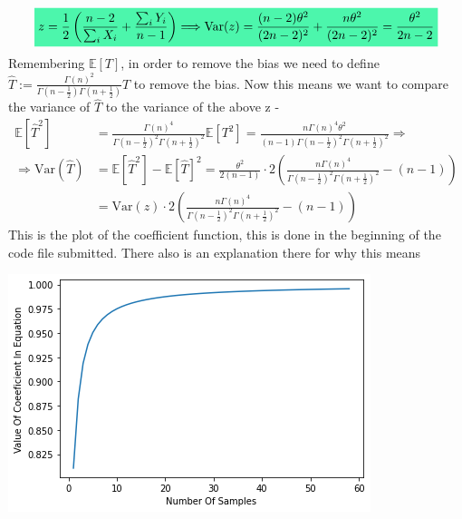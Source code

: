 \documentclass[../main.tex]{subfiles}
\begin{document}
\begin{enumerate}
    \[\mathcolorbox{goodcolor}{z=\frac{1}{2}\left(\frac{n-2}{\sum_i X_i} + \frac{\sum_i Y_i}{n-1}\right)\Longrightarrow \text{Var}(z) = \frac{(n-2)\theta^2}{(2n-2)^2}+\frac{n\theta^2}{(2n-2)^2} = \frac{\theta^2}{2n-2}}\]
    Remembering $\mathbb{E}[T]$, in order to remove the bias we need to define $\hat{T}:= \frac{\Gamma(n)^2}{\Gamma(n-\frac{1}{2})\Gamma(n+\frac{1}{2})}T$ to remove the bias. Now this means we want to compare the variance of $\hat{T}$ to the variance of the above z - 
    \begin{align*}
    \mathbb{E}\left[\hat{T}^2\right] &= \frac{\Gamma(n)^4}{\Gamma(n-\frac{1}{2})^2\Gamma(n+\frac{1}{2})^2}\mathbb{E}\left[T^2\right] = \frac{n\Gamma(n)^4\theta^2}{(n-1)\Gamma(n-\frac{1}{2})^2\Gamma(n+\frac{1}{2})^2} \Longrightarrow \\
    \Longrightarrow\text{Var}\left(\hat{T}\right) &= \mathbb{E}\left[\hat{T}^2\right] - \mathbb{E}\left[\hat{T}\right]^2 = \frac{\theta^2}{2(n-1)}\cdot 2 \left(\frac{n\Gamma(n)^4}{\Gamma(n-\frac{1}{2})^2\Gamma(n+\frac{1}{2})^2} - (n-1)\right)\\
    &= \text{Var}(z)\cdot 2 \left(\frac{n\Gamma(n)^4}{\Gamma(n-\frac{1}{2})^2\Gamma(n+\frac{1}{2})^2} - (n-1)\right)
    \end{align*}
    This is the plot of the coefficient function, this is done in the beginning of the code file submitted. There also is an explanation there for why this means  
    
    \begin{mdframed}[backgroundcolor=blue!20]
        \begin{center}
            \includegraphics[scale=0.75]{images/WeirdFuncPlot.png}
        \end{center}
    \end{mdframed}

\end{enumerate}

\noindent\makebox[\linewidth]{\rule{\linewidth}{2pt}}
\end{document}
